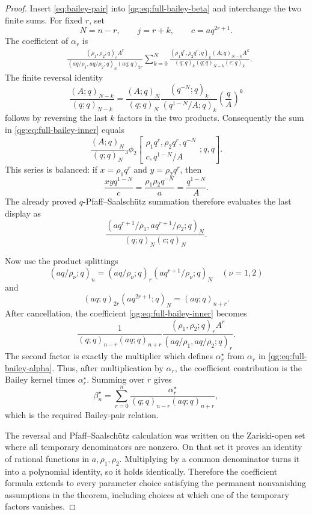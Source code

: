 \begin{proof}
Insert \eqref{eq:bailey-pair} into
\eqref{qg:eq:full-bailey-beta} and interchange the two finite sums.
For fixed \(r\), set
\[
  N=n-r,\qquad j=r+k,\qquad c=aq^{2r+1}.
\]
The coefficient of \(\alpha_r\) is
\begin{align}
 &\frac{(\rho_1,\rho_2;q)_rA^r}
 {(aq/\rho_1,aq/\rho_2;q)_n(aq;q)_{2r}}
 \sum_{k=0}^{N}
 \frac{(\rho_1q^r,\rho_2q^r;q)_k(A;q)_{N-k}A^k}
 {(q;q)_k(q;q)_{N-k}(c;q)_k}.
 \label{qg:eq:full-bailey-inner}
\end{align}
The finite reversal identity
\begin{equation}
 \frac{(A;q)_{N-k}}{(q;q)_{N-k}}
 =
 \frac{(A;q)_N}{(q;q)_N}
 \frac{(q^{-N};q)_k}{(q^{1-N}/A;q)_k}
 \left(\frac qA\right)^k
 \label{qg:eq:finite-reversal}
\end{equation}
follows by reversing the last \(k\) factors in the two products.
Consequently the sum in \eqref{qg:eq:full-bailey-inner} equals
\[
 \frac{(A;q)_N}{(q;q)_N}
 {}_3\phi_2\!\left[
 \begin{matrix}
   \rho_1q^r,\rho_2q^r,q^{-N}\\
   c,q^{1-N}/A
 \end{matrix};q,q
 \right].
\]
This series is balanced: if \(x=\rho_1q^r\) and
\(y=\rho_2q^r\), then
\[
  \frac{xyq^{1-N}}c
  =\frac{\rho_1\rho_2q^{-N}}a
  =\frac{q^{1-N}}A.
\]
The already proved \(q\)-Pfaff--Saalsch\"utz summation
 therefore evaluates the last display as
\begin{equation}
  \frac{(aq^{r+1}/\rho_1,aq^{r+1}/\rho_2;q)_N}
       {(q;q)_N(c;q)_N}.
  \label{qg:eq:full-bailey-inner-evaluation}
\end{equation}

Now use the product splittings
\[
 (aq/\rho_\nu;q)_n
 =(aq/\rho_\nu;q)_r(aq^{r+1}/\rho_\nu;q)_N
 \quad(\nu=1,2)
\]
and
\[
  (aq;q)_{2r}(aq^{2r+1};q)_N=(aq;q)_{n+r}.
\]
After cancellation, the coefficient
\eqref{qg:eq:full-bailey-inner} becomes
\[
 \frac{1}{(q;q)_{n-r}(aq;q)_{n+r}}
 \frac{(\rho_1,\rho_2;q)_rA^r}
      {(aq/\rho_1,aq/\rho_2;q)_r}.
\]
The second factor is exactly the multiplier which defines
\(\alpha_r^\star\) from \(\alpha_r\) in
\eqref{qg:eq:full-bailey-alpha}.  Thus, after multiplication by
\(\alpha_r\), the coefficient contribution is the Bailey kernel times
\(\alpha_r^\star\).  Summing over \(r\) gives
\[
  \beta_n^\star
  =\sum_{r=0}^{n}
    \frac{\alpha_r^\star}
         {(q;q)_{n-r}(aq;q)_{n+r}},
\]
which is the required Bailey-pair relation.

The reversal and Pfaff--Saalsch\"utz calculation was written on the
Zariski-open set where all temporary denominators are nonzero.  On that set
it proves an identity of rational functions in \(a,\rho_1,\rho_2\).
Multiplying by a common denominator turns it into a polynomial identity, so
it holds identically.  Therefore the coefficient formula extends to every
parameter choice satisfying the permanent nonvanishing assumptions in the
theorem, including choices at which one of the temporary factors vanishes.
\end{proof}


